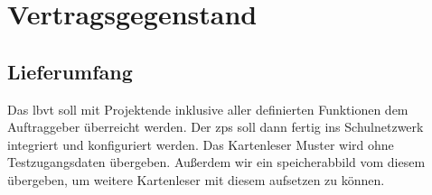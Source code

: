 \section{Vertragsgegenstand}
\subsection{Lieferumfang}
Das \gls{lbvt} soll mit Projektende inklusive aller definierten Funktionen dem Auftraggeber überreicht werden. Der \gls{zps} soll dann fertig ins Schulnetzwerk integriert und konfiguriert werden. Das Kartenleser Muster wird ohne Testzugangsdaten übergeben. 
Außerdem wir ein \gls{speicherabbild} vom diesem übergeben, um weitere Kartenleser mit diesem aufsetzen zu können.  
